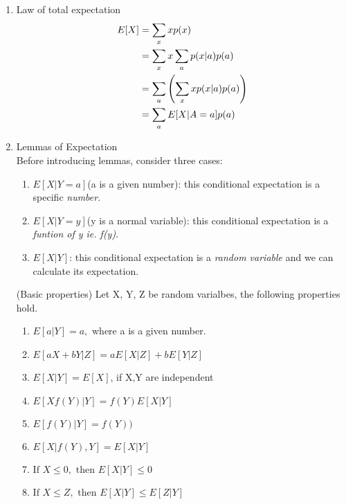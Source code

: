   \begin{enumerate}

    \item
          Law of total expectation
          \begin{align}
            E[X] & = \sum_{x}xp(x) \notag                            \\
                 & = \sum_{x}x \sum_{a}p(x|a)p(a) \notag             \\
                 & = \sum_{a}\left(\sum_{x}xp(x|a)p(a)\right) \notag \\
                 & = \sum_{a}E[X|A=a]p(a)
          \end{align}
    \item
          Lemmas of Expectation \\ Before introducing lemmas, consider three cases:
          \begin{enumerate}

            \item
                  $E[X|Y=a]$(a is a given number): this conditional expectation is a specific \textit{number}.
            \item
                  $E[X|Y=y]$(y is a normal variable): this conditional expectation is a \textit{funtion of y ie. f(y)}.
            \item
                  $E[X|Y]$: this conditional expectation is a \textit{random variable} and we can calculate its expectation.

          \end{enumerate}
          \begin{lemma}{(Basic properties)}
            \label{le2}
            Let X, Y, Z be random varialbes, the following properties hold.
            \begin{enumerate}
              \item
                    $E[a|Y]=a,$ where a is a given number.
              \item
                    $E[aX+bY|Z]= aE[X|Z]+bE[Y|Z]$
              \item
                    $E[X|Y]=E[X]$, if X,Y are independent
              \item
                    $E[Xf(Y)|Y] = f(Y)E[X|Y]$
              \item
                    $E[f(Y)|Y]=f(Y))$
              \item
                    $E[X|f(Y),Y]=E[X|Y]$
              \item
                    $\text{If }X \le 0, \text{ then }E[X|Y] \le 0$
              \item
                    $\text{If }X \le Z, \text{ then }E[X|Y] \le E[Z|Y]$


\end{enumerate}
\end{lemma}
\end{enumerate}
